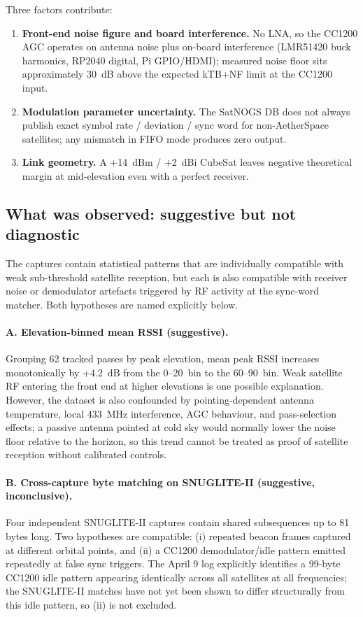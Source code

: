 Three factors contribute:

\begin{enumerate}
    \item \textbf{Front-end noise figure and board interference.} No LNA, so the CC1200 AGC operates on antenna noise plus on-board interference (LMR51420 buck harmonics, RP2040 digital, Pi GPIO/HDMI); measured noise floor sits approximately 30~dB above the expected kTB+NF limit at the CC1200 input.
    \item \textbf{Modulation parameter uncertainty.} The SatNOGS DB does not always publish exact symbol rate / deviation / sync word for non-AetherSpace satellites; any mismatch in FIFO mode produces zero output.
    \item \textbf{Link geometry.} A +14~dBm / +2~dBi CubeSat leaves negative theoretical margin at mid-elevation even with a perfect receiver.
\end{enumerate}

\subsection{What was observed: suggestive but not diagnostic}

The captures contain statistical patterns that are individually compatible with weak sub-threshold satellite reception, but each is also compatible with receiver noise or demodulator artefacts triggered by RF activity at the sync-word matcher. Both hypotheses are named explicitly below.

\paragraph{A. Elevation-binned mean RSSI (suggestive).} Grouping 62 tracked passes by peak elevation, mean peak RSSI increases monotonically by +4.2~dB from the 0--20\degree\ bin to the 60--90\degree\ bin. Weak satellite RF entering the front end at higher elevations is one possible explanation. However, the dataset is also confounded by pointing-dependent antenna temperature, local 433~MHz interference, AGC behaviour, and pass-selection effects; a passive antenna pointed at cold sky would normally lower the noise floor relative to the horizon, so this trend cannot be treated as proof of satellite reception without calibrated controls.

\paragraph{B. Cross-capture byte matching on SNUGLITE-II (suggestive, inconclusive).} Four independent SNUGLITE-II captures contain shared subsequences up to 81 bytes long. Two hypotheses are compatible: (i) repeated beacon frames captured at different orbital points, and (ii) a CC1200 demodulator/idle pattern emitted repeatedly at false sync triggers. The April 9 log explicitly identifies a 99-byte CC1200 idle pattern appearing identically across all satellites at all frequencies; the SNUGLITE-II matches have not yet been shown to differ structurally from this idle pattern, so (ii) is not excluded.

